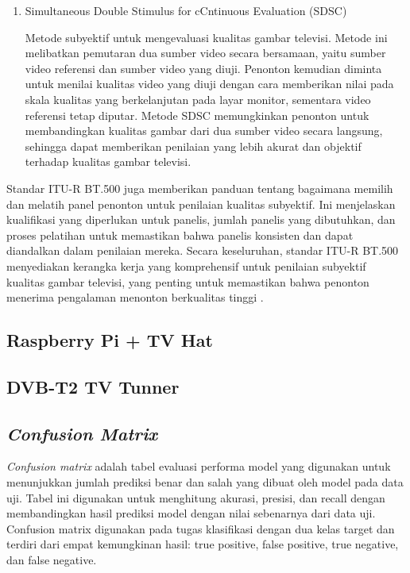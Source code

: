 \begin{enumerate}
		\item Simultaneous Double Stimulus for cCntinuous Evaluation (SDSC) 
		
		Metode subyektif untuk mengevaluasi kualitas gambar televisi. Metode ini melibatkan pemutaran dua sumber video secara bersamaan, yaitu sumber video referensi dan sumber video yang diuji. Penonton kemudian diminta untuk menilai kualitas video yang diuji dengan cara memberikan nilai pada skala kualitas yang berkelanjutan pada layar monitor, sementara video referensi tetap diputar. Metode SDSC memungkinkan penonton untuk membandingkan kualitas gambar dari dua sumber video secara langsung, sehingga dapat memberikan penilaian yang lebih akurat dan objektif terhadap kualitas gambar televisi. 
\end{enumerate}

Standar ITU-R BT.500 juga memberikan panduan tentang bagaimana memilih dan melatih panel penonton untuk penilaian kualitas subyektif. Ini menjelaskan kualifikasi yang diperlukan untuk panelis, jumlah panelis yang dibutuhkan, dan proses pelatihan untuk memastikan bahwa panelis konsisten dan dapat diandalkan dalam penilaian mereka. Secara keseluruhan, standar ITU-R BT.500 menyediakan kerangka kerja yang komprehensif untuk penilaian subyektif kualitas gambar televisi, yang penting untuk memastikan bahwa penonton menerima pengalaman menonton berkualitas tinggi \citep{Mart_nez_Rach_2014}.

\subsection{Raspberry Pi + TV Hat}
\subsection{DVB-T2 TV Tunner}


\subsection{\textit{Confusion Matrix}}
\hspace{1.2cm}
\textit{Confusion matrix }adalah tabel evaluasi performa model yang digunakan untuk menunjukkan jumlah prediksi benar dan salah yang dibuat oleh model pada data uji. Tabel ini digunakan untuk menghitung akurasi, presisi, dan recall dengan membandingkan hasil prediksi model dengan nilai sebenarnya dari data uji. Confusion matrix digunakan pada tugas klasifikasi dengan dua kelas target dan terdiri dari empat kemungkinan hasil: true positive, false positive, true negative, dan false negative.

